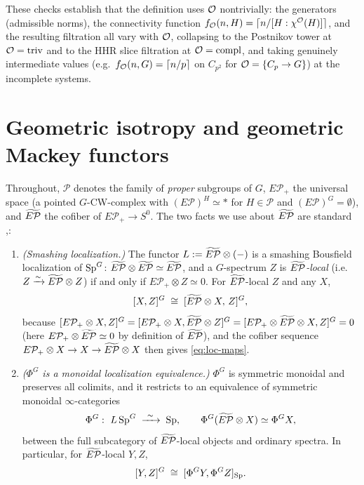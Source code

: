 These checks establish that the definition uses $\mathcal{O}$ nontrivially: the
generators (admissible norms), the connectivity function $f_{\mathcal{O}}(n,H)=\lceil
n/[H:\chi^{\mathcal{O}}(H)]\rceil$, and the resulting filtration all vary with $\mathcal{O}$,
collapsing to the Postnikov tower at $\mathcal{O}=\mathrm{triv}$ and to the HHR slice
filtration at $\mathcal{O}=\mathrm{compl}$, and taking genuinely intermediate values
(e.g.\ $f_{\mathcal{O}}(n,G)=\lceil n/p\rceil$ on $C_{p^2}$ for $\mathcal{O}=\{C_p\to G\}$)
at the incomplete systems.

\section*{Geometric isotropy and geometric Mackey functors}

Throughout, $\mathcal P$ denotes the family of \emph{proper} subgroups of $G$,
$E\mathcal P_+$ the universal space (a pointed $G$-CW-complex with
$(E\mathcal P)^H\simeq\ast$ for $H\in\mathcal P$ and $(E\mathcal P)^G=\emptyset$),
and $\widetilde{E\mathcal P}$ the cofiber of $E\mathcal P_+\to S^0$. The two facts we use about
$\widetilde{E\mathcal P}$ are standard \cite[\S2.5, \S6]{HillPrimer},\cite[\S2.5.2]{HHR16}:

\begin{enumerate}\setlength\itemsep{3pt}
\item[(L1)] \emph{(Smashing localization.)} The functor $L:=\widetilde{E\mathcal P}\otimes(-)$ is a
smashing Bousfield localization of $\mathrm{Sp}^G$: $\widetilde{E\mathcal P}\otimes\widetilde{E\mathcal P}\simeq\widetilde{E\mathcal P}$,
and a $G$-spectrum $Z$ is \emph{$\widetilde{E\mathcal P}$-local} (i.e.\ $Z\xrightarrow{\sim}\widetilde{E\mathcal P}\otimes
Z$) if and only if $E\mathcal P_+\otimes Z\simeq 0$. For $\widetilde{E\mathcal P}$-local $Z$ and any
$X$,
\begin{equation}\label{eq:loc-maps}
[X,Z]^G\;\cong\;[\widetilde{E\mathcal P}\otimes X,\,Z]^G ,
\end{equation}
because $[E\mathcal P_+\otimes X,Z]^G=[E\mathcal P_+\otimes X,\widetilde{E\mathcal P}\otimes Z]^G=
[E\mathcal P_+\otimes\widetilde{E\mathcal P}\otimes X,Z]^G=0$ (here $E\mathcal P_+\otimes\widetilde{E\mathcal P}\simeq 0$
by definition of $\widetilde{E\mathcal P}$), and the cofiber sequence $E\mathcal P_+\otimes X\to X\to
\widetilde{E\mathcal P}\otimes X$ then gives \eqref{eq:loc-maps}.
\item[(L2)] \emph{($\Phi^G$ is a monoidal localization equivalence.)} $\Phi^G$ is
symmetric monoidal and preserves all colimits, and it restricts to an equivalence
of symmetric monoidal $\infty$-categories
\[
\Phi^G:\ L\,\qfiveSp^G\;\xrightarrow{\ \sim\ }\;\qfiveSp ,
\qquad \Phi^G(\qfiveEP\otimes X)\simeq\Phi^G X ,
\]
between the full subcategory of $\widetilde{E\mathcal P}$-local objects and ordinary spectra. In
particular, for $\widetilde{E\mathcal P}$-local $Y,Z$,
\begin{equation}\label{eq:phi-maps}
[Y,Z]^G\;\cong\;[\Phi^G Y,\Phi^G Z]_{\mathrm{Sp}}.
\end{equation}
\end{enumerate}

